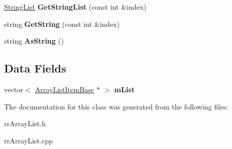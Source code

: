 \begin{DoxyCompactItemize}
\item 
\hypertarget{classrrc_1_1_array_list_a0d713d8ec0ca7a64280381f7cf4f5519}{\hyperlink{classrrc_1_1_string_list}{String\-List} {\bfseries Get\-String\-List} (const int \&index)}\label{classrrc_1_1_array_list_a0d713d8ec0ca7a64280381f7cf4f5519}

\item 
\hypertarget{classrrc_1_1_array_list_a5d5c7bbe7e47d8a8f91911a7bcd4636d}{string {\bfseries Get\-String} (const int \&index)}\label{classrrc_1_1_array_list_a5d5c7bbe7e47d8a8f91911a7bcd4636d}

\item 
\hypertarget{classrrc_1_1_array_list_afb0cb51aaa92f311621daed306530e97}{string {\bfseries As\-String} ()}\label{classrrc_1_1_array_list_afb0cb51aaa92f311621daed306530e97}

\end{DoxyCompactItemize}
\subsection*{Data Fields}
\begin{DoxyCompactItemize}
\item 
\hypertarget{classrrc_1_1_array_list_a7825d7740ce9e23ba3f867189698155e}{vector$<$ \hyperlink{classrrc_1_1_array_list_item_base}{Array\-List\-Item\-Base} $\ast$ $>$ {\bfseries m\-List}}\label{classrrc_1_1_array_list_a7825d7740ce9e23ba3f867189698155e}

\end{DoxyCompactItemize}


The documentation for this class was generated from the following files\-:\begin{DoxyCompactItemize}
\item 
rr\-Array\-List.\-h\item 
rr\-Array\-List.\-cpp\end{DoxyCompactItemize}
